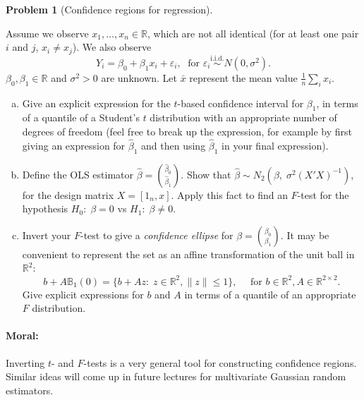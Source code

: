 \documentclass{article}
\newcommand{\RR}{\mathbb{R}}
\newcommand{\simiid}{\overset{\text{i.i.d.}}{\sim}}
\newcommand{\ep}{\varepsilon}
\theoremstyle{definition}
\newtheorem{problem}{Problem}
\begin{document}
\begin{problem}[Confidence regions for regression]
\label{prob:conf-reg-regression}

Assume we observe $x_1,\ldots,x_n \in \RR$, which are not all identical (for at least one pair $i$ and $j$, $x_i\neq x_j$). We also observe
\[
Y_i = \beta_0 + \beta_1 x_i + \ep_i, \; \text{ for } \ep_i \simiid N(0,\sigma^2).
\]
$\beta_0,\beta_1\in \RR$ and $\sigma^2 > 0$ are unknown. Let $\bar{x}$ represent the mean value $\frac{1}{n}\sum_i x_i$.

\begin{enumerate}[(a)]
\item Give an explicit expression for the $t$-based confidence interval for $\beta_1$, in terms of a quantile of a Student's $t$ distribution with an appropriate number of degrees of freedom (feel free to break up the expression, for example by first giving an expression for $\hat\beta_1$ and then using $\hat\beta_1$ in your final expression).




\item Define the OLS estimator $\hat\beta = \binom{\hat\beta_0}{\hat\beta_1}$. Show that $\hat\beta \sim N_2\left(\beta, \; \sigma^2(X'X)^{-1}\right)$, for the design matrix $X = [1_n, x]$. Apply this fact to find an $F$-test for the hypothesis $H_0:\;\beta=0$ vs $H_1:\;\beta \neq 0$.



\item Invert your $F$-test to give a {\em confidence ellipse} for $\beta = \binom{\beta_0}{\beta_1}$.  It may be convenient to represent the set as an affine transformation of the unit ball in $\RR^2$:
\[
b + A \mathbb{B}_1(0) = \{b + Az:\; z\in \RR^2, \|z\| \leq 1\}, \quad \text{ for } b \in \RR^2, A \in \RR^{2\times 2}.
\]
Give explicit expressions for $b$ and $A$ in terms of a quantile of an appropriate $F$ distribution.





\end{enumerate}

\paragraph{Moral:} Inverting $t$- and $F$-tests is a very general tool for constructing confidence regions. Similar ideas will come up in future lectures for multivariate Gaussian random estimators.
\end{problem}
\end{document}
